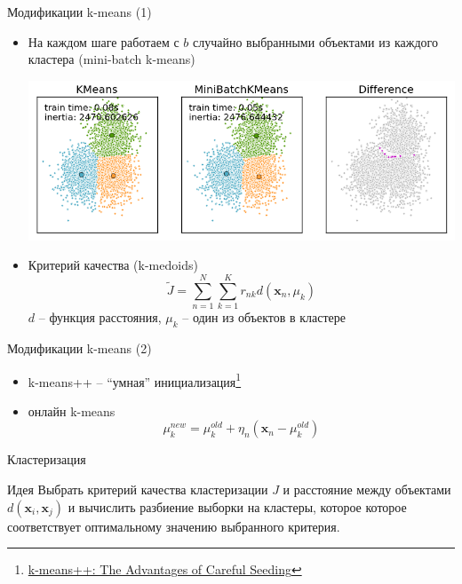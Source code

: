 \documentclass[aspectratio=169]{beamer}
\begin{document}
\begin{frame}{Модификации k-means (1)}

\begin{itemize}
\item На каждом шаге работаем с $b$ случайно выбранными объектами из каждого кластера (mini-batch k-means) \\
\begin{center}
\includegraphics[scale=0.35]{images/mbatch.png}
\end{center}
\item Критерий качества (k-medoids)
\[
\tilde J = \sum_{n=1}^N \sum_{k=1}^K r_{nk} d(\mathbf{x}_n, \mu_k)
\]
$d$ -- функция расстояния, $\mu_k$ -- один из объектов в кластере
\end{itemize}

\end{frame}

\begin{frame}{Модификации k-means (2)}

\begin{itemize}
\item k-means++ -- ``умная'' инициализация\footnote{\href{http://theory.stanford.edu/~sergei/papers/kMeansPP-soda.pdf}{k-means++: The Advantages of Careful Seeding}}
\item онлайн k-means
\[
\mu_k^{new} = \mu_k^{old} + \eta_n (\mathbf{x}_n - \mu_k^{old})
\]
\end{itemize}

\end{frame}

\begin{frame}{Кластеризация}

\begin{block}{Идея}
Выбрать критерий качества кластеризации $J$ и расстояние между объектами $d(\mathbf{x}_i, \mathbf{x}_j)$ и вычислить разбиение выборки на кластеры, которое которое соответствует оптимальному значению выбранного критерия.
\end{block}

\end{frame}
\end{document}
